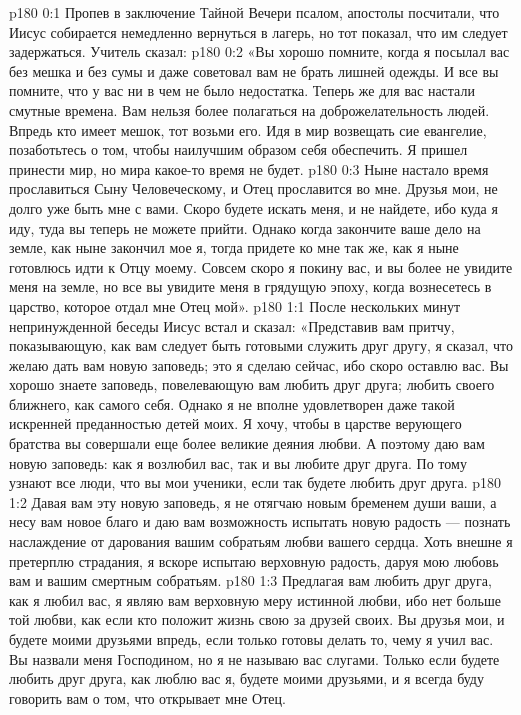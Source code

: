 \author{Комиссия срединников}
\vs p180 0:1 Пропев в заключение Тайной Вечери псалом, апостолы посчитали, что Иисус собирается немедленно вернуться в лагерь, но тот показал, что им следует задержаться. Учитель сказал:
\vs p180 0:2 «Вы хорошо помните, когда я посылал вас без мешка и без сумы и даже советовал вам не брать лишней одежды. И все вы помните, что у вас ни в чем не было недостатка. Теперь же для вас настали смутные времена. Вам нельзя более полагаться на доброжелательность людей. Впредь кто имеет мешок, тот возьми его. Идя в мир возвещать сие евангелие, позаботьтесь о том, чтобы наилучшим образом себя обеспечить. Я пришел принести мир, но мира какое\hyp{}то время не будет.
\vs p180 0:3 Ныне настало время прославиться Сыну Человеческому, и Отец прославится во мне. Друзья мои, не долго уже быть мне с вами. Скоро будете искать меня, и не найдете, ибо куда я иду, туда вы теперь не можете прийти. Однако когда закончите ваше дело на земле, как ныне закончил мое я, тогда придете ко мне так же, как я ныне готовлюсь идти к Отцу моему. Совсем скоро я покину вас, и вы более не увидите меня на земле, но все вы увидите меня в грядущую эпоху, когда вознесетесь в царство, которое отдал мне Отец мой».
\vs p180 1:1 После нескольких минут непринужденной беседы Иисус встал и сказал: «Представив вам притчу, показывающую, как вам следует быть готовыми служить друг другу, я сказал, что желаю дать вам новую заповедь; это я сделаю сейчас, ибо скоро оставлю вас. Вы хорошо знаете заповедь, повелевающую вам любить друг друга; любить своего ближнего, как самого себя. Однако я не вполне удовлетворен даже такой искренней преданностью детей моих. Я хочу, чтобы в царстве верующего братства вы совершали еще более великие деяния любви. А поэтому даю вам новую заповедь: как я возлюбил вас, так и вы любите друг друга. По тому узнают все люди, что вы мои ученики, если так будете любить друг друга.
\vs p180 1:2 Давая вам эту новую заповедь, я не отягчаю новым бременем души ваши, а несу вам новое благо и даю вам возможность испытать новую радость --- познать наслаждение от дарования вашим собратьям любви вашего сердца. Хоть внешне я претерплю страдания, я вскоре испытаю верховную радость, даруя мою любовь вам и вашим смертным собратьям.
\vs p180 1:3 Предлагая вам любить друг друга, как я любил вас, я являю вам верховную меру истинной любви, ибо нет больше той любви, как если кто положит жизнь свою за друзей своих. Вы друзья мои, и будете моими друзьями впредь, если только готовы делать то, чему я учил вас. Вы назвали меня Господином, но я не называю вас слугами. Только если будете любить друг друга, как люблю вас я, будете моими друзьями, и я всегда буду говорить вам о том, что открывает мне Отец.
